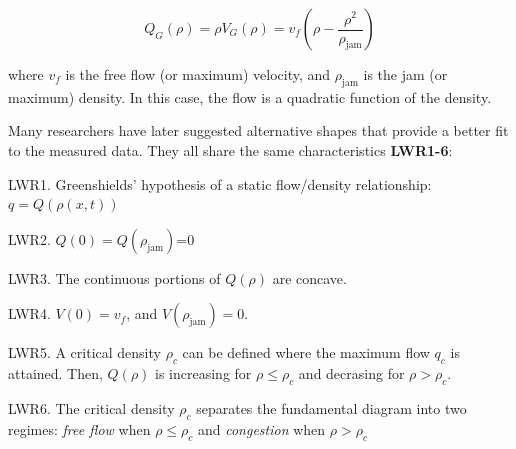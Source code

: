 \begin{equation} \label{eq:greenshieldsFlux}
Q_{G}(\rho) = \rho V_{G}(\rho) = v_{f}(\rho-\frac{\rho^{2}}{\rho_{\text{jam}}})
\end{equation}

where $v_{f}$ is the free flow (or maximum) velocity, and $\rho_{\text{jam}}$ is the jam (or maximum) density. In this case, the flow is a quadratic function of the density. 

Many researchers have later suggested alternative shapes that provide a better fit to the measured data. They all share the same characteristics \textbf{LWR1-6}:

LWR1. Greenshields' hypothesis of a static flow/density relationship: $q = Q(\rho(x,t))$

LWR2. $Q(0)=Q(\rho_{\text{jam}})$=0

LWR3. The continuous portions of $Q(\rho)$ are concave.

LWR4. $V(0) = v_{f}$, and $V(\rho_{\text{jam}}) = 0$.

LWR5. A critical density $\rho_{c}$ can be defined where the maximum flow $q_{c}$ is attained. Then, $Q(\rho)$ is increasing for $\rho \leq \rho_{c}$ and decrasing for $\rho > \rho_{c}$.

LWR6. The critical density $\rho_{c}$ separates the fundamental diagram into two regimes: \textit{free flow} when $\rho \leq \rho_{c}$ and \textit{congestion} when $\rho > \rho_{c}$

